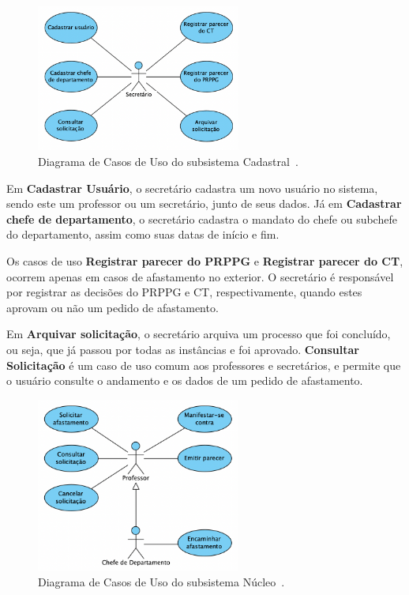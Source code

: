 \begin{figure}
    \centering
    \includegraphics[width=0.6\textwidth]{figuras/fig-caso-cadastral.png}
    \caption{Diagrama de Casos de Uso do subsistema Cadastral~\cite{prado:2015}.}
    \label{fig:casos-de-uso-cadastral}
\end{figure}

Em \textbf{Cadastrar Usuário}, o secretário cadastra um novo usuário no sistema, sendo
este um professor ou um secretário, junto de seus dados. Já em \textbf{Cadastrar chefe de departamento},
o secretário cadastra o mandato do chefe ou subchefe do departamento, assim como suas datas de início e fim.

Os casos de uso \textbf{Registrar parecer do PRPPG} e \textbf{Registrar parecer do CT}, ocorrem
apenas em casos de afastamento no exterior. O secretário é responsável por registrar as decisões
do PRPPG e CT, respectivamente, quando estes aprovam ou não um pedido de afastamento.

Em \textbf{Arquivar solicitação}, o secretário arquiva um processo que foi concluído, ou seja, que
já passou por todas as instâncias e foi aprovado. \textbf{Consultar Solicitação} é um caso de uso
comum aos professores e secretários, e permite que o usuário consulte o andamento e os dados de um
pedido de afastamento.


\begin{figure}
    \centering
    \includegraphics[width=0.6\textwidth]{figuras/fig-caso-nucleo.png}
    \caption{Diagrama de Casos de Uso do subsistema Núcleo~\cite{prado:2015}.}
    \label{fig:casos-de-uso-nucleo}
\end{figure}


